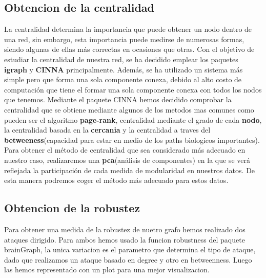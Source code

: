 \subsection{Obtencion de la centralidad}
La centralidad determina la importancia que puede obtener un nodo dentro de una red, sin embargo, esta importancia puede medirse de numerosas formas, siendo algunas de ellas m\'as correctas en ocasiones que otras.
Con el objetivo de estudiar la centralidad de nuestra red, se ha decidido emplear los paquetes \textbf{igraph} y \textbf{CINNA} principalmente. Adem\'as, se ha utilizado un sistema m\'as simple pero que forma una sola componente conexa, debido al alto costo de computaci\'on que tiene el formar una sola componente conexa con todos los nodos que tenemos.
Mediante el paquete CINNA hemos decidido comprobar la centralidad que se obtiene mediante algunos de los metodos mas comunes como pueden ser el algoritmo \textbf{page-rank}, centralidad mediante el grado de cada \textbf{nodo}, la centralidad basada en la \textbf{cercania} y la centralidad a traves del \textbf{betweeness}(capacidad para estar en medio de los paths biologicos importantes).
Para obtener el m\'etodo de centralidad que sea considerado m\'as adecuado en nuestro caso, realizaremos una \textbf{pca}(an\'alisis de componentes) en la que se ver\'a reflejada la participaci\'on de cada medida de modularidad en nuestros datos. De esta manera podremos coger el método más adecuado para estos datos.

\subsection{Obtencion de la robustez}
Para obtener una medida de la robustez de nuetro grafo hemos realizado dos ataques dirigido. Para ambos hemos usado la funcion robustness del paquete brainGraph, la unica variacion es el parametro que determina el tipo de ataque, dado que realizamos un ataque basado en degree y otro en betweenness. Luego las hemos representado con un plot para una mejor visualizacion.
